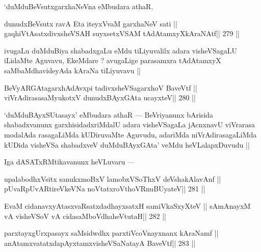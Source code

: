 \begin{artha}
`duMduBeVsutxgarxhaNeVna eMbudara athaR.
\end{artha}

\begin{shl}
dunudxBeVsutx ravA Eta iteyxVvaM garxhaNeV sati ||
gaqhiVtAsatxdivxsheVSAH suyxsetxVSAM tAdAtamxyXkAraNAtf\hfill || 279 ||
\end{shl}

\begin{artha}
ivugaLu duMduBiya shabadxgaLu eMdu tiLiyuvalilx adara visheVSagaLU iLidaMte Aguvavu, EkeMdare ? avugaLige parasamxra tAdAtamxyX saMbaMdhavideyAda kAraNa tiLiyuvavu ||
\end{artha}

\begin{shl}
BeVyARGAtagarxhAdAvx\s pi tadivxsheVSagarxhoV BaveVtf ||
viVrAdirasasaMyukotxV dunudxBAyxGAta ucayxteV\hfill || 280 ||
\end{shl}

\begin{artha}
`duMduBAyxSUtasayx' eMbudara athaR --- BeVriyanunx bArisida shabadxvanunx garxhisidadxriMdalU adara visheVSagaLa jAcnxnavU viVrarasa modalAda rasagaLiMda kUDiruvaMte Aguvudu, adariMda niVrAdirasagaLiMda kUDida visheVSa shabadxveV duMduBAyxGAta' veMdu heVLalapxDuvudu ||
\end{artha}

\begin{artha}
Iga dASATxRMtikavanunx heVLuvaru ---
\end{artha}

\begin{shl}
upalabodhxV\s sitx sanukxmoBxV lamobxVSoThxV deVshakAlavAnf ||
pUvaRpUvARtireVkeVNa noVtatxroV\s thoVR\s nuBUyateV\hfill || 281 ||
\end{shl}

\begin{artha}
\end{artha}

\begin{artha}

\end{artha}

\begin{shl}
EvaM cidanavxyAtasxvaRsatxdadhayxsatxH samiVkaSxyXteV ||
sAmAnayxM vA visheVSoV vA cidasaMboVdhaheVtutaH\hfill || 282 ||
\end{shl}

\begin{shl}
parxtayxgUrxpasayx saMsidwdhx parxtiVcoV\s nayxnanx kAraNamf ||
anAtamxvatatxdapAyxtamxvisheVSaNatayA BaveVtf\hfill || 283 ||
\end{shl}

